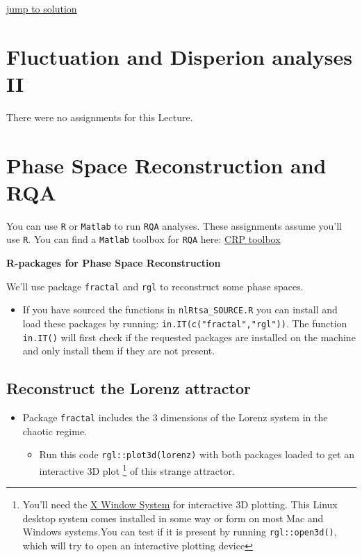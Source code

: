 \documentclass[]{book}
\providecommand{\tightlist}{%
  \setlength{\itemsep}{0pt}\setlength{\parskip}{0pt}}
\let\rmarkdownfootnote\footnote%
\def\footnote{\protect\rmarkdownfootnote}
\let\stdsection\section
\renewcommand\section{\newpage\stdsection}
\begin{document}
\protect\hyperlink{chaossol}{\textbar{} jump to solution \textbar{}}

\chapter{Fluctuation and Disperion analyses II}\label{fda2}

There were no assignments for this Lecture.

\chapter{\texorpdfstring{\textbf{Phase Space Reconstruction and
RQA}}{Phase Space Reconstruction and RQA}}\label{RQA}

You can use \texttt{R} or \texttt{Matlab} to run \texttt{RQA} analyses.
These assignments assume you'll use \texttt{R}. You can find a
\texttt{Matlab} toolbox for \texttt{RQA} here:
\href{http://tocsy.pik-potsdam.de/CRPtoolbox/}{CRP toolbox}

\textbf{R-packages for Phase Space Reconstruction}

We'll use package \texttt{fractal} and \texttt{rgl} to reconstruct some
phase spaces.

\begin{itemize}
\tightlist
\item
  If you have sourced the functions in \texttt{nlRtsa\_SOURCE.R} you can
  install and load these packages by running:
  \texttt{in.IT(c("fractal","rgl"))}. The function \texttt{in.IT()} will
  first check if the requested packages are installed on the machine and
  only install them if they are not present.
\end{itemize}

\section{Reconstruct the Lorenz
attractor}\label{reconstruct-the-lorenz-attractor}

\begin{itemize}
\tightlist
\item
  Package \texttt{fractal} includes the 3 dimensions of the Lorenz
  system in the chaotic regime.

  \begin{itemize}
  \tightlist
  \item
    Run this code \texttt{rgl::plot3d(lorenz)} with both packages loaded
    to get an interactive 3D plot \footnote{You'll need the
      \href{http://www.x.org/wiki/}{X Window System} for interactive 3D
      plotting. This Linux desktop system comes installed in some way or
      form on most Mac and Windows systems.You can test if it is present
      by running \texttt{rgl::open3d()}, which will try to open an
      interactive plotting device} of this strange attractor.
  \end{itemize}
\end{itemize}
\end{document}

